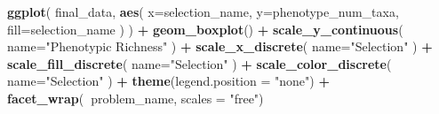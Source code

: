 \documentclass[]{book}
\newenvironment{Shaded}{\begin{snugshade}}{\end{snugshade}}
\newcommand{\CommentTok}[1]{\textcolor[rgb]{0.56,0.35,0.01}{\textit{#1}}}
\newcommand{\DataTypeTok}[1]{\textcolor[rgb]{0.13,0.29,0.53}{#1}}
\newcommand{\DecValTok}[1]{\textcolor[rgb]{0.00,0.00,0.81}{#1}}
\newcommand{\KeywordTok}[1]{\textcolor[rgb]{0.13,0.29,0.53}{\textbf{#1}}}
\newcommand{\NormalTok}[1]{#1}
\newcommand{\OperatorTok}[1]{\textcolor[rgb]{0.81,0.36,0.00}{\textbf{#1}}}
\newcommand{\StringTok}[1]{\textcolor[rgb]{0.31,0.60,0.02}{#1}}
\begin{document}
\begin{Shaded}
\end{Shaded}

\begin{Shaded}
\begin{Highlighting}[]
\KeywordTok{ggplot}\NormalTok{(}
\NormalTok{    final_data,}
    \KeywordTok{aes}\NormalTok{(}
      \DataTypeTok{x=}\NormalTok{selection_name,}
      \DataTypeTok{y=}\NormalTok{phenotype_num_taxa,}
      \DataTypeTok{fill=}\NormalTok{selection_name}
\NormalTok{    )}
\NormalTok{  ) }\OperatorTok{+}
\StringTok{  }\KeywordTok{geom_boxplot}\NormalTok{() }\OperatorTok{+}
\StringTok{  }\KeywordTok{scale_y_continuous}\NormalTok{(}
    \DataTypeTok{name=}\StringTok{"Phenotypic Richness"}
\NormalTok{  ) }\OperatorTok{+}
\StringTok{  }\KeywordTok{scale_x_discrete}\NormalTok{(}
    \DataTypeTok{name=}\StringTok{"Selection"}
\NormalTok{  ) }\OperatorTok{+}
\StringTok{  }\KeywordTok{scale_fill_discrete}\NormalTok{(}
    \DataTypeTok{name=}\StringTok{"Selection"}
\NormalTok{  ) }\OperatorTok{+}
\StringTok{  }\KeywordTok{scale_color_discrete}\NormalTok{(}
    \DataTypeTok{name=}\StringTok{"Selection"}
\NormalTok{  ) }\OperatorTok{+}
\StringTok{  }\KeywordTok{theme}\NormalTok{(}\DataTypeTok{legend.position =} \StringTok{"none"}\NormalTok{) }\OperatorTok{+}
\StringTok{  }\KeywordTok{facet_wrap}\NormalTok{(}\OperatorTok{~}\NormalTok{problem_name, }\DataTypeTok{scales =} \StringTok{"free"}\NormalTok{)}
\end{Highlighting}
\end{Shaded}
\end{document}
